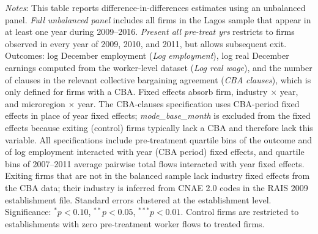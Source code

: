 \begin{table}[H]
\begin{minipage}{\textwidth}
\textit{Notes}: This table reports difference-in-differences estimates using an unbalanced panel. \textit{Full unbalanced panel} includes all firms in the Lagos sample that appear in at least one year during 2009--2016. \textit{Present all pre-treat yrs} restricts to firms observed in every year of 2009, 2010, and 2011, but allows subsequent exit. Outcomes: log December employment (\textit{Log employment}), log real December earnings computed from the worker-level dataset (\textit{Log real wage}), and the number of clauses in the relevant collective bargaining agreement (\textit{CBA clauses}), which is only defined for firms with a CBA. Fixed effects absorb firm, industry $\times$ year, and microregion $\times$ year. The CBA-clauses specification uses CBA-period fixed effects in place of year fixed effects; \textit{mode\_base\_month} is excluded from the fixed effects because exiting (control) firms typically lack a CBA and therefore lack this variable. All specifications include pre-treatment quartile bins of the outcome and of log employment interacted with year (CBA period) fixed effects, and quartile bins of 2007--2011 average pairwise total flows interacted with year fixed effects. Exiting firms that are not in the balanced sample lack industry fixed effects from the CBA data; their industry is inferred from CNAE 2.0 codes in the RAIS 2009 establishment file. Standard errors clustered at the establishment level. Significance: $^{*}p{<}0.10$, $^{**}p{<}0.05$, $^{***}p{<}0.01$. Control firms are restricted to establishments with zero pre-treatment worker flows to treated firms.
\end{minipage}
\end{table}
